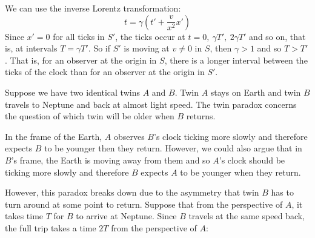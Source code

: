 \documentclass[../main.tex]{subfiles}
\begin{document}
We can use the inverse Lorentz transformation:
\[
  t = \gamma\left(t' + \frac{v}{x^2}x'\right)
\]
Since $x' = 0$ for all ticks in $S'$, the ticks occur at $t = 0,\ \gamma T',\ 2\gamma T'$ and so on, that is, at intervals $T = \gamma T'$.
So if $S'$ is moving at $v \neq 0$ in $S$, then $\gamma > 1$ and so $T > T'$.
That is, for an observer at the origin in $S$, there is a longer interval between the ticks of the clock than for an observer at the origin in $S'$.
\begin{example}
  Suppose we have two identical twins $A$ and $B$.
  Twin $A$ stays on Earth and twin $B$ travels to Neptune and back at almost light speed.
  The twin paradox concerns the question of which twin will be older when $B$ returns.

  In the frame of the Earth, $A$ observes $B$'s clock ticking more slowly and therefore expects $B$ to be younger then they return.
  However, we could also argue that in $B$'s frame, the Earth is moving away from them and so $A$'s clock should be ticking more slowly and therefore $B$ expects $A$ to be younger when they return.

  However, this paradox breaks down due to the asymmetry that twin $B$ has to turn around at some point to return.
  Suppose that from the perspective of $A$, it takes time $T$ for $B$ to arrive at Neptune.
  Since $B$ travels at the same speed back, the full trip takes a time $2T$ from the perspective of $A$:
  \begin{center}
\end{center}
\end{example}
\end{document}
